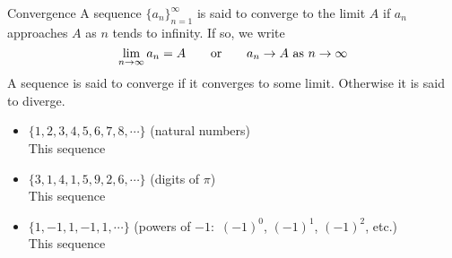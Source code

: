 \begin{frame}
\begin{block}{Convergence}
A sequence $\big\{a_n\big\}_{n=1}^\infty$ is said to \alert{converge} to the limit
$A$ if $a_n$ approaches $A$ as $n$ tends to infinity. If so, we write
\begin{equation*}
\lim_{n\rightarrow\infty} a_n=A\qquad\hbox{or}\qquad
a_n\rightarrow A\text{ as }n\rightarrow\infty
\end{equation*}
A sequence is said to converge if it converges to some limit. Otherwise
it is said to diverge.
\end{block}

\begin{itemize}
\item $\{1,2,3,4,5,6,7,8,\cdots\}$ (natural numbers)\\ This sequence  \vfill
\item $\{3,1,4,1,5,9,2,6,\cdots\}$  (digits of $\pi$)\\ This sequence \vfill
\item $\{1,-1,1,-1,1,\cdots\}$  (powers of $-1:$ $(-1)^0$, $(-1)^1$, $(-1)^2$, etc.)\\ This sequence  
\end{itemize}
\end{frame}

